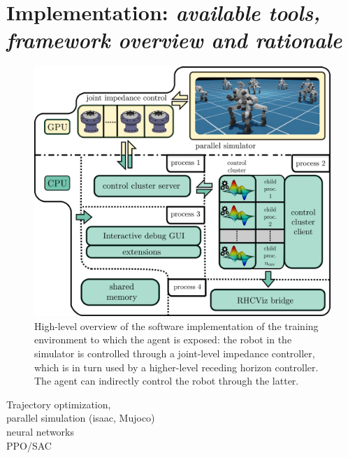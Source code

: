 \section{Implementation: \textnormal{\textit{available tools, framework overview and rationale}}}
\begin{figure}[t]
	\centering
	\includegraphics[width=1.0\columnwidth]{imgs/cocluster_arch.pdf}
	\caption{High-level overview of the software implementation of the training environment to which the agent is exposed: the robot in the simulator is controlled through a joint-level impedance controller, which is in turn used by a higher-level receding horizon controller. The agent can indirectly control the robot through the latter.}
	\label{fig:coclbridge_arch}
\end{figure}
Trajectory optimization, \\
parallel simulation (isaac, Mujoco)\\
neural networks\\
PPO/SAC\\

\cite{rl:mujocoaccelereted2023}
\cite{frameworks:mittal2023orbit}

